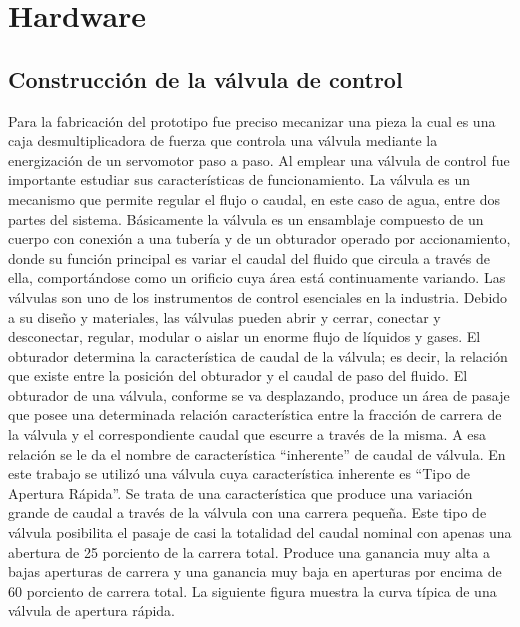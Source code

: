 \section{Hardware}
\subsection{Construcción de la válvula de control}
\label{subsec:Construcción de la válvula de control}
Para la fabricación del prototipo fue preciso mecanizar una pieza la cual es una caja desmultiplicadora de fuerza que controla una válvula mediante la energización de un servomotor paso a paso. 
Al emplear una válvula de control fue importante estudiar sus características de funcionamiento. 
La válvula es un mecanismo que permite regular el flujo  o caudal, en este caso de agua, entre dos partes del sistema. 
Básicamente la válvula es un ensamblaje compuesto de un cuerpo con conexión a una tubería y de un obturador operado por accionamiento, donde su función principal es variar el caudal del fluido que circula a través de ella, comportándose como un orificio cuya área está continuamente variando. Las válvulas son uno de los instrumentos de control esenciales en la industria.
Debido a su diseño y materiales, las válvulas pueden abrir y cerrar, conectar y desconectar, regular, modular o aislar un enorme  flujo de líquidos y gases.
El obturador determina la característica de caudal de la válvula; es decir, la relación que existe entre la posición del obturador y el caudal de paso del fluido.
El obturador de una válvula, conforme se va desplazando, produce un área de pasaje que posee una determinada relación característica entre la fracción de carrera de la válvula y el correspondiente caudal que escurre a través de la misma. A esa relación se le da el nombre de característica “inherente” de caudal de válvula.
En este trabajo se utilizó una válvula cuya característica inherente es “Tipo de Apertura Rápida”.
Se trata de una característica que produce una variación grande de caudal a través de la válvula con una carrera pequeña. Este tipo de válvula posibilita el pasaje de casi la totalidad del caudal nominal con apenas una abertura de 25 porciento de la carrera total.
Produce una ganancia muy alta a bajas aperturas de carrera y una ganancia muy baja en aperturas por encima de 60 porciento de carrera total. 
La siguiente figura muestra la curva típica de una válvula de apertura rápida.
